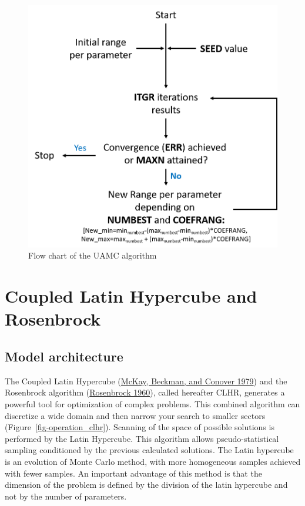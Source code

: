 \documentclass[
  letterpaper,
  DIV=11,
  numbers=noendperiod]{scrreprt}
\begin{document}
\begin{figure}

{\centering \includegraphics{./figures/fig-flowchart_uamc.png}

}

\caption{\label{fig-flowchart_uamc}Flow chart of the UAMC algorithm}

\end{figure}

\hypertarget{sec-tech_calibration_algorithms_rosenb}{%
\chapter{Coupled Latin Hypercube and
Rosenbrock}\label{sec-tech_calibration_algorithms_rosenb}}

\hypertarget{model-architecture-2}{%
\section{Model architecture}\label{model-architecture-2}}

The Coupled Latin Hypercube
(\protect\hyperlink{ref-mckay_comparison_1979}{McKay, Beckman, and
Conover 1979}) and the Rosenbrock algorithm
(\protect\hyperlink{ref-rosenbrock_automatic_1960}{Rosenbrock 1960}),
called hereafter CLHR, generates a powerful tool for optimization of
complex problems. This combined algorithm can discretize a wide domain
and then narrow your search to smaller sectors
(Figure~\ref{fig-operation_clhr}). Scanning of the space of possible
solutions is performed by the Latin Hypercube. This algorithm allows
pseudo-statistical sampling conditioned by the previous calculated
solutions. The Latin hypercube is an evolution of Monte Carlo method,
with more homogeneous samples achieved with fewer samples. An important
advantage of this method is that the dimension of the problem is defined
by the division of the latin hypercube and not by the number of
parameters.
\end{document}

